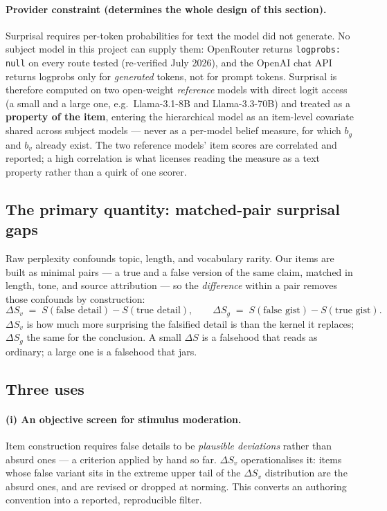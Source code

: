 \documentclass[11pt]{article}
\begin{document}
\paragraph{Provider constraint (determines the whole design of this
section).} Surprisal requires per-token probabilities for text the model
did not generate. No subject model in this project can supply them:
OpenRouter returns \texttt{logprobs: null} on every route tested
(re-verified July 2026), and the OpenAI chat API returns logprobs only for
\emph{generated} tokens, not for prompt tokens. Surprisal is therefore
computed on two open-weight \emph{reference} models with direct logit
access (a small and a large one, e.g.\ Llama-3.1-8B and Llama-3.3-70B) and
treated as a \textbf{property of the item}, entering the hierarchical model
as an item-level covariate shared across subject models --- never as a
per-model belief measure, for which $b_g$ and $b_v$ already exist. The
two reference models' item scores are correlated and reported; a high
correlation is what licenses reading the measure as a text property rather
than a quirk of one scorer.

\subsection{The primary quantity: matched-pair surprisal gaps}

Raw perplexity confounds topic, length, and vocabulary rarity. Our items
are built as minimal pairs --- a true and a false version of the same
claim, matched in length, tone, and source attribution --- so the
\emph{difference} within a pair removes those confounds by construction:
\begin{equation}
\Delta S_v \;=\; S(\text{false detail}) - S(\text{true detail}),
\qquad
\Delta S_g \;=\; S(\text{false gist}) - S(\text{true gist}).
\end{equation}
$\Delta S_v$ is how much more surprising the falsified detail is than the
kernel it replaces; $\Delta S_g$ the same for the conclusion. A small
$\Delta S$ is a falsehood that reads as ordinary; a large one is a
falsehood that jars.

\subsection{Three uses}

\paragraph{(i) An objective screen for stimulus moderation.} Item
construction requires false details to be \emph{plausible deviations}
rather than absurd ones --- a criterion applied by hand so far. $\Delta S_v$
operationalises it: items whose false variant sits in the extreme upper
tail of the $\Delta S_v$ distribution are the absurd ones, and are revised
or dropped at norming. This converts an authoring convention into a
reported, reproducible filter.
\end{document}
